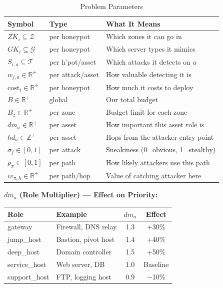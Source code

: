 \documentclass[journal]{IEEEtran}
\newcommand{\calT}{\mathcal{T}}
\newcommand{\calZ}{\mathcal{Z}}
\newcommand{\calG}{\mathcal{G}}
\begin{document}
\begin{table}[htbp]
\caption{Problem Parameters}
\label{tab:params}
\centering
\renewcommand{\arraystretch}{1.2}
\begin{tabular}{@{}lll@{}}
\toprule
\textbf{Symbol} & \textbf{Type} & \textbf{What It Means} \\
\midrule
$ZK_i \subseteq \calZ$        & per honeypot  & Which zones it can go in \\
$GK_i \subseteq \calG$        & per honeypot  & Which server types it mimics \\
$S_{i,a} \subseteq \calT$     & per h'pot/asset& Which attacks it detects on $a$ \\
$w_{j,a} \in \mathbb{R}^+$    & per attack/asset& How valuable detecting it is \\
$\mathrm{cost}_i \in \mathbb{R}^+$ & per honeypot & How much it costs to deploy \\
$B \in \mathbb{R}^+$          & global        & Our total budget \\
$B_z \in \mathbb{R}^+$        & per zone      & Budget limit for each zone \\
$dm_a \in \mathbb{R}^+$       & per asset     & How important this asset role is \\
$hd_a \in \mathbb{Z}^+$       & per asset     & Hops from the attacker entry point \\
$\sigma_j \in [0,1]$          & per attack    & Sneakiness (0=obvious, 1=stealthy) \\
$\rho_\pi \in [0,1]$          & per path      & How likely attackers use this path \\
$iv_{\pi,h} \in \mathbb{R}^+$ & per path/hop  & Value of catching attacker here \\
\bottomrule
\end{tabular}
\end{table}

\begin{examplebox}
\textbf{$dm_a$ (Role Multiplier) --- Effect on Priority:}
\begin{center}
\small
\renewcommand{\arraystretch}{1.1}
\begin{tabular}{@{}llcc@{}}
\toprule
\textbf{Role} & \textbf{Example} & $dm_a$ & \textbf{Effect} \\
\midrule
gateway      & Firewall, DNS relay & 1.3 & +30\% \\
jump\_host   & Bastion, pivot host & 1.4 & +40\% \\
deep\_host   & Domain controller   & 1.5 & +50\% \\
service\_host& Web server, DB      & 1.0 & Baseline \\
support\_host& FTP, logging host   & 0.9 & $-$10\% \\
\bottomrule
\end{tabular}
\end{center}
\end{examplebox}
\end{document}
